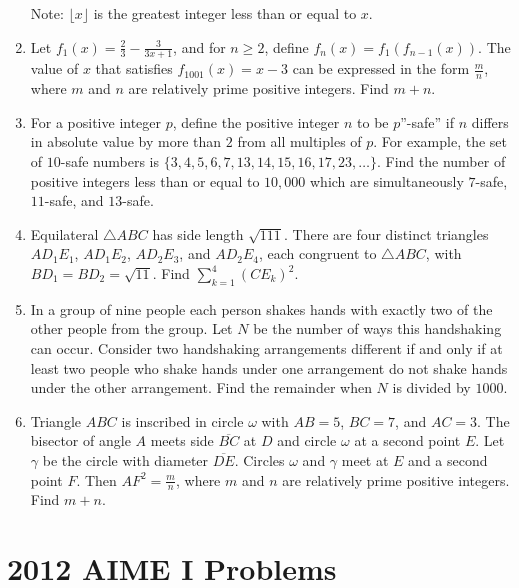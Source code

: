\documentclass{article}
\begin{document}
\begin{enumerate}[label=\arabic*., itemsep=0.5em]
Note: \(\lfloor x \rfloor\) is the greatest integer less than or equal to \(x\).\par \vspace{0.5em}\item Let \(f_1(x) = \frac23 - \frac3{3x+1}\), and for \(n \ge 2\), define \(f_n(x) = f_1(f_{n-1}(x))\). The value of \(x\) that satisfies \(f_{1001}(x) = x-3\) can be expressed in the form \(\frac mn\), where \(m\) and \(n\) are relatively prime positive integers. Find \(m+n\).\par \vspace{0.5em}\item For a positive integer \(p\), define the positive integer \(n\) to be \(p\)''-safe'' if \(n\) differs in absolute value by more than \(2\) from all multiples of \(p\). For example, the set of \(10\)-safe numbers is \(\{ 3, 4, 5, 6, 7, 13, 14, 15, 16, 17, 23, \ldots\}\). Find the number of positive integers less than or equal to \(10,000\) which are simultaneously \(7\)-safe, \(11\)-safe, and \(13\)-safe.\par \vspace{0.5em}\item Equilateral \(\triangle ABC\) has side length \(\sqrt{111}\). There are four distinct triangles \(AD_1E_1\), \(AD_1E_2\), \(AD_2E_3\), and \(AD_2E_4\), each congruent to \(\triangle ABC\),
with \(BD_1 = BD_2 = \sqrt{11}\). Find \(\sum_{k=1}^4(CE_k)^2\).\par \vspace{0.5em}\item In a group of nine people each person shakes hands with exactly two of the other people from the group. Let \(N\) be the number of ways this handshaking can occur. Consider two handshaking arrangements different if and only if at least two people who shake hands under one arrangement do not shake hands under the other arrangement. Find the remainder when \(N\) is divided by \(1000\).\par \vspace{0.5em}\item Triangle \(ABC\) is inscribed in circle \(\omega\) with \(AB=5\), \(BC=7\), and \(AC=3\). The bisector of angle \(A\) meets side \(\overline{BC}\) at \(D\) and circle \(\omega\) at a second point \(E\). Let \(\gamma\) be the circle with diameter \(\overline{DE}\). Circles \(\omega\) and \(\gamma\) meet at \(E\) and a second point \(F\). Then \(AF^2 = \frac mn\), where \(m\) and \(n\) are relatively prime positive integers. Find \(m+n\).\par \vspace{0.5em}\end{enumerate}\newpage\section*{2012 AIME I Problems}
\end{document}

